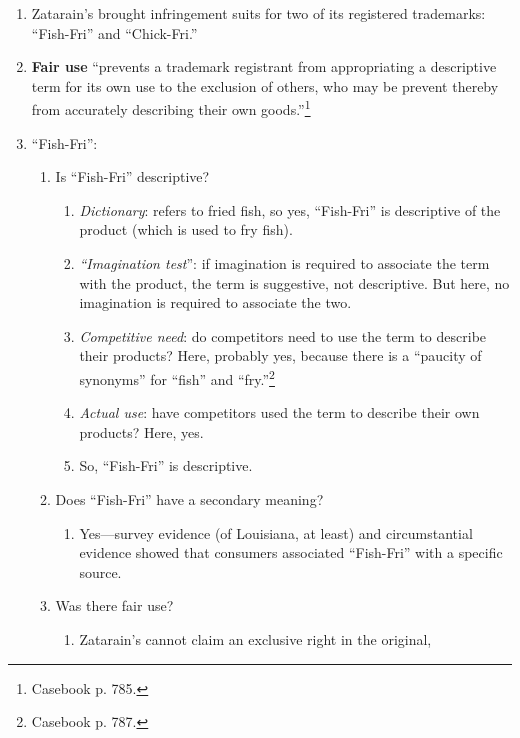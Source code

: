\begin{enumerate}
    \item Zatarain's brought infringement suits for two of its registered 
    trademarks: ``Fish-Fri'' and ``Chick-Fri.''
    \item \textbf{Fair use} ``prevents a trademark registrant from 
    appropriating a descriptive term for its own use to the exclusion of 
    others, who may be prevent thereby from accurately describing their own 
    goods.''\footnote{Casebook p. 785.}
    \item ``Fish-Fri'':
    \begin{enumerate}
        \item Is ``Fish-Fri'' descriptive?
        \begin{enumerate}
            \item \emph{Dictionary}: refers to fried fish, so yes, 
            ``Fish-Fri'' is descriptive of the product (which is used to fry 
            fish).
            \item \emph{``Imagination test}'': if imagination is required to 
            associate the term with the product, the term is suggestive, not 
            descriptive. But here, no imagination is required to associate the 
            two.
            \item \emph{Competitive need}: do competitors need to use the term 
            to describe their products? Here, probably yes, because there is a 
            ``paucity of synonyms'' for ``fish'' and 
            ``fry.''\footnote{Casebook p. 787.}
            \item \emph{Actual use}: have competitors used the term to 
            describe their own products? Here, yes.
            \item So, ``Fish-Fri'' is descriptive.
        \end{enumerate}
        \item Does ``Fish-Fri'' have a secondary meaning?
        \begin{enumerate}
            \item Yes---survey evidence (of Louisiana, at least) and 
            circumstantial evidence showed that consumers associated 
            ``Fish-Fri'' with a specific source.
        \end{enumerate}
        \item Was there fair use?
        \begin{enumerate}
            \item Zatarain's cannot claim an exclusive right in the original, 

\end{enumerate}
\end{enumerate}
\end{enumerate}
